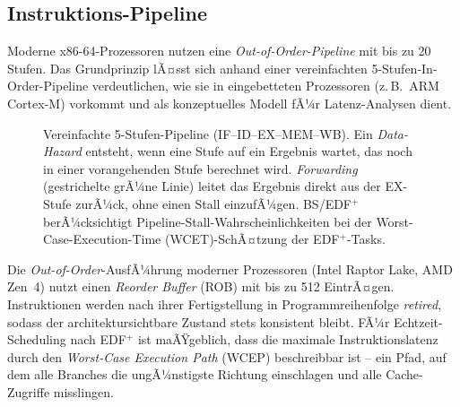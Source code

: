 ﻿\documentclass[a4paper,12pt]{scrreprt}
\theoremstyle{definition}
\begin{document}
	\subsection{Instruktions-Pipeline}

	Moderne x86-64-Prozessoren nutzen eine \emph{Out-of-Order-Pipeline} mit bis zu
	20 Stufen. Das Grundprinzip lÃ¤sst sich anhand einer vereinfachten
	5-Stufen-In-Order-Pipeline verdeutlichen, wie sie in eingebetteten Prozessoren
	(z.\,B.\ ARM Cortex-M) vorkommt und als konzeptuelles Modell fÃ¼r
	Latenz-Analysen dient.

	\begin{figure}[H]
		\centering
		\caption{Vereinfachte 5-Stufen-Pipeline (IF--ID--EX--MEM--WB). Ein
			\emph{Data-Hazard} entsteht, wenn eine Stufe auf ein Ergebnis wartet,
			das noch in einer vorangehenden Stufe berechnet wird. \emph{Forwarding}
			(gestrichelte grÃ¼ne Linie) leitet das Ergebnis direkt aus der EX-Stufe
			zurÃ¼ck, ohne einen Stall einzufÃ¼gen. BS/EDF$^+$ berÃ¼cksichtigt
			Pipeline-Stall-Wahrscheinlichkeiten bei der Worst-Case-Execution-Time
			(WCET)-SchÃ¤tzung der EDF$^+$-Tasks.}
		\label{fig:pipeline}
	\end{figure}

	Die \emph{Out-of-Order}-AusfÃ¼hrung moderner Prozessoren (Intel Raptor Lake,
	AMD Zen~4) nutzt einen \emph{Reorder Buffer} (ROB) mit bis zu 512 EintrÃ¤gen.
	Instruktionen werden nach ihrer Fertigstellung in Programm\-reihenfolge
	\emph{retired}, sodass der architektursichtbare Zustand stets konsistent bleibt.
	FÃ¼r Echtzeit-Scheduling nach EDF$^+$ ist maÃŸgeblich, dass die maximale
	Instruktionslatenz durch den \emph{Worst-Case Execution Path} (WCEP)
	beschreibbar ist -- ein Pfad, auf dem alle Branches die ungÃ¼nstigste
	Richtung einschlagen und alle Cache-Zugriffe misslingen.
\end{document}
